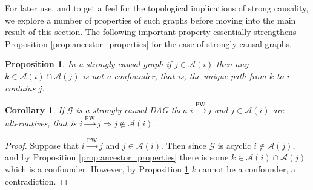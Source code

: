 \documentclass{statsoc}
\def\pwgc{\overset{\text{PW}}{\rightarrow}}  %
\def\gcg{\mathcal{G}}  %
\newcommand{\anc}[1]{\mathcal{A}(#1)}  %
\newcommand{\gcgpath}[2]{#1 \rightarrow \cdots \rightarrow #2}  %
\newtheorem{corollary}{Corollary}
\newtheorem{proposition}{Proposition}
\begin{document}
For later use, and to get a feel for the topological implications of
strong causality, we explore a number of properties of such graphs
before moving into the main result of this section.  The following
important property essentially strengthens Proposition
\ref{prop:ancestor_properties} for the case of strongly causal graphs.

\begin{proposition}
  \label{prop:sc_graph_common_anc}
  In a strongly causal graph if $j \in \anc{i}$ then any
  $k \in \anc{i} \cap \anc{j}$ is not a confounder, that is,
  the unique path from $k$ to $i$ contains $j$.
\end{proposition}

\begin{corollary}
  \label{cor:parent_corollary}
  If $\gcg$ is a strongly causal DAG then $i \pwgc j$ and $j \in \anc{i}$ are
  \textit{alternatives}, that is $i \pwgc j \Rightarrow j \notin \anc{i}$.
\end{corollary}
\begin{proof}
  Suppose that $i \pwgc j$ and $j \in \anc{i}$.  Then since $\gcg$ is
  acyclic $i \not\in \anc{j}$, and by Proposition
  \ref{prop:ancestor_properties} there is some
  $k \in \anc{i}\cap\anc{j}$ which is a confounder.  However, by
  Proposition \ref{prop:sc_graph_common_anc} $k$ cannot be a
  confounder, a contradiction.
\end{proof}



  
\end{document}
